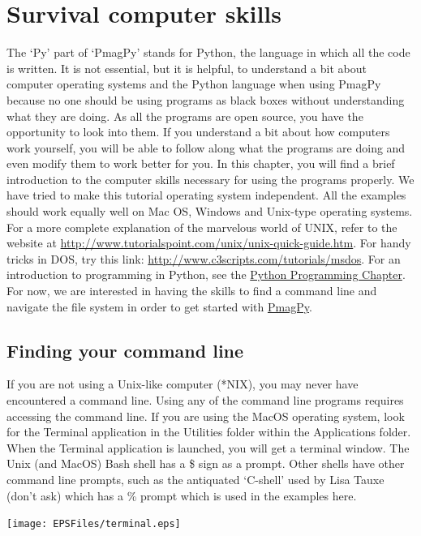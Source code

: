 \documentclass[11pt]{book}
\begin{document}
{{
\chapter{Survival computer skills}
\label{ex:unix}

The `Py' part of  `PmagPy' stands for Python, the language in which all the code is written.   It is not essential, but it is helpful, to understand a bit about computer operating systems and the Python language when using PmagPy because no one should be using programs as black boxes without understanding what they are doing. As all the programs are open source, you have the opportunity to look into them.  If you understand a bit about how computers work yourself, you will be able to follow along what the programs are doing and even modify them to work better for you. In this chapter, you will find a brief introduction to the computer skills necessary for using the programs properly.  We have tried to make this tutorial operating system independent.  All the examples should work equally well on Mac OS, Windows and Unix-type operating systems.  For a more complete explanation of the marvelous world of UNIX, refer to the website at \url{http://www.tutorialspoint.com/unix/unix-quick-guide.htm}.  For handy tricks in DOS, try this link:  \url{http://www.c3scripts.com/tutorials/msdos}.
For an introduction to programming in Python, see the \href{#Python}{Python Programming Chapter}.   For now, we are interested in having the skills to find a command line and navigate the file system in order to get started with \href{#PmagPy}{PmagPy}.


\section{Finding your command line}
If you are not using a Unix-like computer (*NIX), you may never have encountered a command line. Using any of the command line programs requires accessing the command line.  If you are using the MacOS operating system, look for the Terminal application in the Utilities folder within the Applications folder. When the Terminal application is launched, you will get a terminal window. The Unix (and MacOS) Bash shell has a \$ sign as a prompt.  Other shells have other command line prompts, such as the antiquated `C-shell' used by Lisa Tauxe (don't ask) which has a \% prompt which is used in the examples here.

  \texttt{[image: EPSFiles/terminal.eps]}

}}
\end{document}
